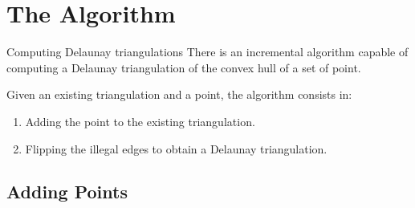 \documentclass[18pt]{beamer}
\begin{document}
\section{The Algorithm}

\begin{frame}{Computing Delaunay triangulations}
There is an incremental algorithm capable of computing a Delaunay triangulation of the convex hull of a set of point.

Given an existing triangulation and a point, the algorithm consists in:
\begin{enumerate}
\item<1-> Adding the point to the existing triangulation.
\item<2-> Flipping the illegal edges to obtain a Delaunay triangulation.
\end{enumerate}
\end{frame}


\subsection{Adding Points}
\end{document}
